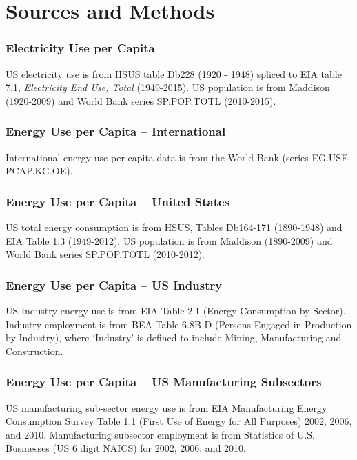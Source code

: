 

\chapter{Sources and Methods}
\label{App_sources}

\subsection*{Electricity Use per Capita}

US electricity use is from HSUS table Db228 (1920 - 1948) spliced to EIA table 7.1, \textit{Electricity End Use, Total }  (1949-2015). US population is from Maddison \cite{maddison_statistics_2008} (1920-2009) and World Bank series SP.POP.TOTL (2010-2015).



\subsection*{Energy Use per Capita -- International}

International energy use per capita data is from the World Bank (series  EG.USE. PCAP.KG.OE). 

\subsection*{Energy Use per Capita -- United States}

US total energy consumption is from HSUS, Tables Db164-171 (1890-1948) and EIA  Table 1.3 (1949-2012). US population is from Maddison \cite{maddison_statistics_2008} (1890-2009) and World Bank series SP.POP.TOTL (2010-2012).


\subsection*{Energy Use per Capita -- US Industry}

US Industry energy use is from EIA Table 2.1 (Energy Consumption by Sector). Industry employment is from BEA Table 6.8B-D (Persons Engaged in Production by Industry), where `Industry' is defined to include Mining, Manufacturing and Construction.

\subsection*{Energy Use per Capita -- US Manufacturing Subsectors}

US manufacturing sub-sector energy use is from EIA Manufacturing Energy Consumption Survey Table 1.1 (First Use of Energy for All Purposes)  2002, 2006, and 2010. Manufacturing subsector employment is from Statistics of U.S. Businesses (US 6 digit NAICS) for 2002, 2006, and 2010. 

